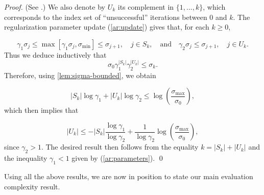 \documentclass[runningheads,orivec,oribibl]{llncs}
\begin{document}
\begin{proof}

  (See \cite[Lemma~2.4]{birgin-gardenghi-martinez-santos-toint-2017}.)
  We also denote by \(U_k\) its complement in \(\{1,...,k\}\), which corresponds to the index set of ``unsuccessful'' iterations between \(0\) and \(k\).
  The regularization parameter update (\ref{ar:update}) gives that, for each \(k \geq 0\),

  \begin{equation*}
    \gamma_1\sigma_j \leq \max[\gamma_1\sigma_j,\sigma_{\min}]
    \leq \sigma_{j+1}, \quad j \in S_k, \quad
    \text{and} \quad \gamma_2\sigma_j \leq \sigma_{j+1}, \quad j \in U_k.
  \end{equation*}
  Thus we deduce inductively that
  \begin{equation*}
    \sigma_0\gamma_1^{|S_k|}\gamma_2^{|U_k|} \leq \sigma_k.
  \end{equation*}
  Therefore, using \autoref{lem:sigma-bounded}, we obtain

  \begin{equation*}
    |S_k|\log\gamma_1 + |U_k|\log\gamma_2 \leq \log\left( \frac{\sigma_{\max}}{\sigma_0}\right),
  \end{equation*}
  which then implies that

  \begin{equation*}
    |U_k|\leq -|S_k|\frac{\log\gamma_1}{\log\gamma_2}
    +\frac{1}{\log\gamma_2} \log \left(\frac{\sigma_{\max}}{\sigma_0}\right),
  \end{equation*}
  since \(\gamma_2 > 1\).
  The desired result then follows from the equality \(k = |S_k|+|U_k|\) and the inequality \(\gamma_1 < 1\) given by (\ref{ar:parameters}).
  \qed

\end{proof}
Using all the above results, we are now in position to state our main evaluation complexity result.
\end{document}
